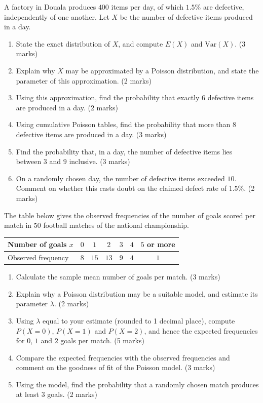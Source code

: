 \documentclass[11pt]{article}
\begin{document}
\begin{exercice}
A factory in Douala produces $400$ items per day, of which $1.5\%$ are defective, independently of one another. Let $X$ be the number of defective items produced in a day.
\begin{enumerate}
\item State the exact distribution of $X$, and compute $E(X)$ and $\mathrm{Var}(X)$. \hfill (3 marks)
\item Explain why $X$ may be approximated by a Poisson distribution, and state the parameter of this approximation. \hfill (2 marks)
\item Using this approximation, find the probability that exactly $6$ defective items are produced in a day. \hfill (2 marks)
\item Using cumulative Poisson tables, find the probability that more than $8$ defective items are produced in a day. \hfill (3 marks)
\item Find the probability that, in a day, the number of defective items lies between $3$ and $9$ inclusive. \hfill (3 marks)
\item On a randomly chosen day, the number of defective items exceeded $10$. Comment on whether this casts doubt on the claimed defect rate of $1.5\%$. \hfill (2 marks)
\end{enumerate}
\end{exercice}

\begin{exercice}
The table below gives the observed frequencies of the number of goals scored per match in $50$ football matches of the national championship.
\begin{center}
\begin{tabular}{|l|cccccc|}
\hline
\rowcolor{popblueL} Number of goals $x$ & $0$ & $1$ & $2$ & $3$ & $4$ & $5$ or more \\
\hline Observed frequency & $8$ & $15$ & $13$ & $9$ & $4$ & $1$ \\
\hline
\end{tabular}
\end{center}
\begin{enumerate}
\item Calculate the sample mean number of goals per match. \hfill (3 marks)
\item Explain why a Poisson distribution may be a suitable model, and estimate its parameter $\lambda$. \hfill (2 marks)
\item Using $\lambda$ equal to your estimate (rounded to 1 decimal place), compute $P(X = 0)$, $P(X = 1)$ and $P(X = 2)$, and hence the expected frequencies for $0$, $1$ and $2$ goals per match. \hfill (5 marks)
\item Compare the expected frequencies with the observed frequencies and comment on the goodness of fit of the Poisson model. \hfill (3 marks)
\item Using the model, find the probability that a randomly chosen match produces at least $3$ goals. \hfill (2 marks)
\end{enumerate}
\end{exercice}
\end{document}
